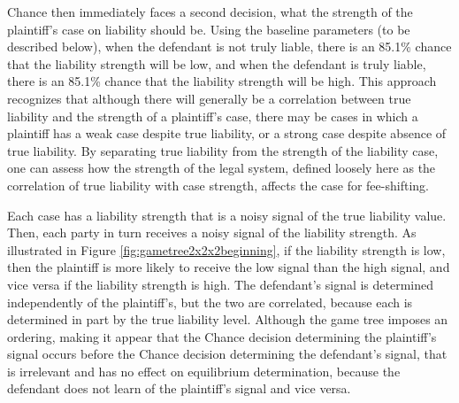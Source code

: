\documentclass{article}
\begin{document}
Chance then immediately faces a second decision, what the strength of the plaintiff's case on liability should be. Using the baseline parameters (to be described below), when the defendant is not truly liable, there is an 85.1\% chance that the liability strength will be low, and when the defendant is truly liable, there is an 85.1\% chance that the liability strength will be high. This approach recognizes that although there will generally be a correlation between true liability and the strength of a plaintiff's case, there may be cases in which a plaintiff has a weak case despite true liability, or a strong case despite absence of true liability. By separating true liability from the strength of the liability case, one can assess how the strength of the legal system, defined loosely here as the correlation of true liability with case strength, affects the case for fee-shifting. 

Each case has a liability strength that is a noisy signal of the true liability value. Then, each party in turn receives a noisy signal of the liability strength.  As illustrated in Figure \ref{fig:gametree2x2x2beginning}, if the liability strength is low, then the plaintiff is more likely to receive the low signal than the high signal, and vice versa if the liability strength is high. The defendant's signal is determined independently of the plaintiff's, but the two are correlated, because each is determined in part by the true liability level. Although the game tree imposes an ordering, making it appear that the Chance decision determining the plaintiff's signal occurs before the Chance decision determining the defendant's signal, that is irrelevant and has no effect on equilibrium determination, because the defendant does not learn of the plaintiff's signal and vice versa.
\end{document}
